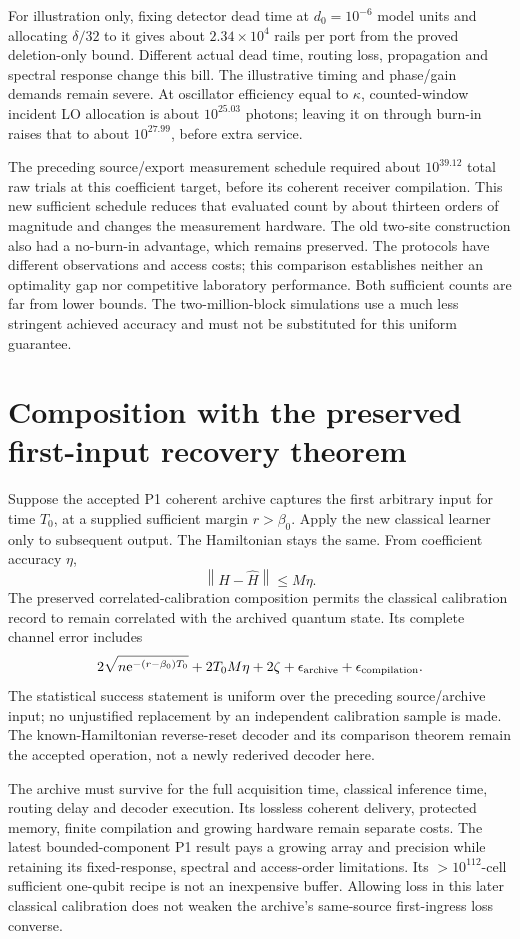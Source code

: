 \documentclass[11pt]{article}
\newcommand{\ee}{\mathrm e}
\newcommand{\norm}[1]{\left\lVert #1\right\rVert}
\begin{document}
For illustration only, fixing detector dead time at \(d_0=10^{-6}\) model units and allocating \(\delta/32\) to it gives about \(2.34\times10^4\) rails per port from the proved deletion-only bound. Different actual dead time, routing loss, propagation and spectral response change this bill. The illustrative timing and phase/gain demands remain severe. At oscillator efficiency equal to \(\kappa\), counted-window incident LO allocation is about \(10^{25.03}\) photons; leaving it on through burn-in raises that to about \(10^{27.99}\), before extra service.

The preceding source/export measurement schedule required about \(10^{39.12}\) total raw trials at this coefficient target, before its coherent receiver compilation. This new sufficient schedule reduces that evaluated count by about thirteen orders of magnitude and changes the measurement hardware. The old two-site construction also had a no-burn-in advantage, which remains preserved. The protocols have different observations and access costs; this comparison establishes neither an optimality gap nor competitive laboratory performance. Both sufficient counts are far from lower bounds. The two-million-block simulations use a much less stringent achieved accuracy and must not be substituted for this uniform guarantee.

\section{Composition with the preserved first-input recovery theorem}
Suppose the accepted P1 coherent archive captures the first arbitrary input for time \(T_0\), at a supplied sufficient margin \(r>\beta_0\). Apply the new classical learner only to subsequent output. The Hamiltonian stays the same. From coefficient accuracy \(\eta\),
\[
 \norm{H-\widehat H}\le M\eta.
\]
The preserved correlated-calibration composition permits the classical calibration record to remain correlated with the archived quantum state. Its complete channel error includes
\[
 2\sqrt{n\ee^{-(r-\beta_0)T_0}}
 +2T_0M\eta+2\zeta
 +\epsilon_{\rm archive}+\epsilon_{\rm compilation}.
\]
The statistical success statement is uniform over the preceding source/archive input; no unjustified replacement by an independent calibration sample is made. The known-Hamiltonian reverse-reset decoder and its comparison theorem remain the accepted operation, not a newly rederived decoder here.

The archive must survive for the full acquisition time, classical inference time, routing delay and decoder execution. Its lossless coherent delivery, protected memory, finite compilation and growing hardware remain separate costs. The latest bounded-component P1 result pays a growing array and precision while retaining its fixed-response, spectral and access-order limitations. Its \(>10^{112}\)-cell sufficient one-qubit recipe is not an inexpensive buffer. Allowing loss in this later classical calibration does not weaken the archive's same-source first-ingress loss converse.
\end{document}
